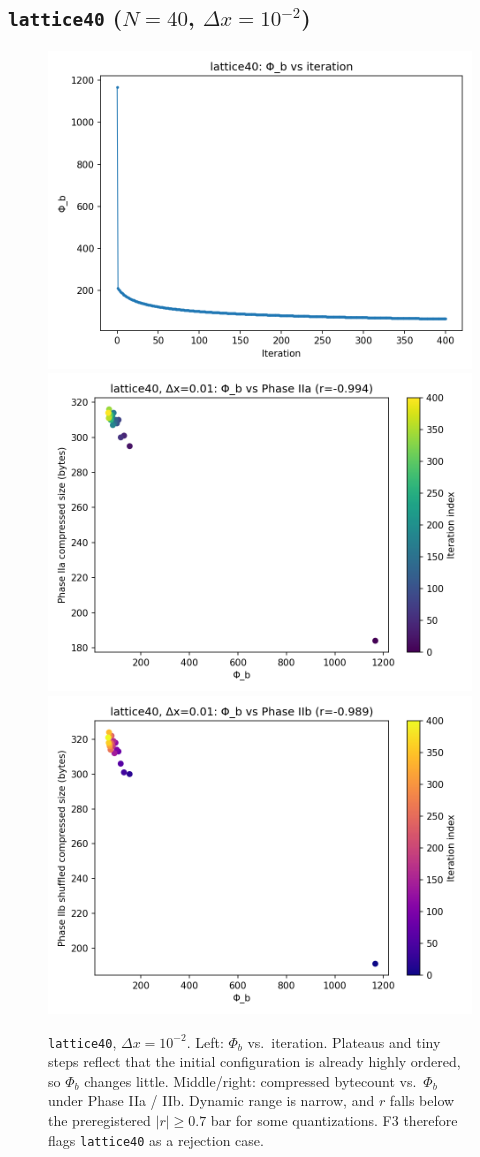 \documentclass[11pt,a4paper]{article}
\newcommand{\phib}{\Phi_b}
\begin{document}
\subsection*{\texttt{lattice40} ($N{=}40$, $\Delta x = 10^{-2}$)}
\begin{figure}[htbp]
\centering
\includegraphics[width=0.32\linewidth]{figures/lattice40_dx0.01_phib_vs_iter.png}
\includegraphics[width=0.32\linewidth]{figures/lattice40_dx0.01_phib_vs_phase2a.png}
\includegraphics[width=0.32\linewidth]{figures/lattice40_dx0.01_phib_vs_phase2b.png}
\caption{\texttt{lattice40}, $\Delta x{=}10^{-2}$. Left: $\phib$ vs.\ iteration. Plateaus and tiny steps reflect that the initial configuration is already highly ordered, so $\phib$ changes little. Middle/right: compressed bytecount vs.\ $\phib$ under Phase IIa / IIb. Dynamic range is narrow, and $r$ falls below the preregistered $|r|\ge0.7$ bar for some quantizations. F3 therefore flags \texttt{lattice40} as a rejection case.}
\label{fig:lattice40}
\end{figure}
\end{document}
